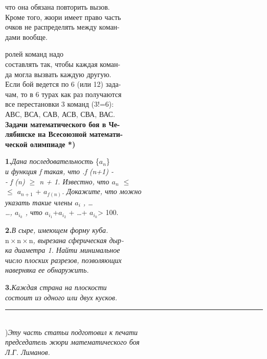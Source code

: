 \newpage
\begin{minipage}[b]{0.47\textwidth}
   \normalsize{
   что она обязана повторить вызов.\\
   Кроме того, жюри имеет право часть\\
   очков не распределять между коман-\\
   дами вообще.

    ролей команд надо\\
    составлять так, чтобы каждая коман-\\
    да могла вызвать каждую другую.\\
    Если бой ведется по 6 (или 12) зада-\\
    чам, то в 6 турах как раз получаются\\
    все перестановки 3 команд (3!=6):\\
    АВС, ВСА, САВ, АСВ, СВА, ВАС.\\

    \textbf{Задачи математического боя в Че-\\
    лябинске на Всесоюзной математи-\\
    ческой олимпиаде *)\\}

    \qquad \textbf{1.}\textit{Дана последовательность} \{$a_n$\}\\
     \textit{и функция f такая, что .f (n+1) -\\
     - f (n) $\ge$ n + 1. Известно, что $a_n$ $\le$\\
     $\le$ $a_{n+1}$} + \textit{$a_{f(n)}$. Докажите, что можно\\
     указать такие члены \indent  $a_i$ , \ldots\\
     \dots , $a_{i_k}$ , что $a_{i_1}$}+\textit{$a_{i_2}$} +   \ldots + \textit{$a_{i_k}$}> 100.

    \qquad \textbf{2.}\textit{В сыре, имеющем форму куба.\\
    $\text{n}\times \text{n}\times \text{n}$, вырезана сферическая дыр-\\
    ка диаметра 1. Найти минимальное\\
    число плоских разрезов, позволяющих\\
    наверняка ее обнаружить.}

    \qquad \textbf{3.}\textit{Каждая страна на плоскости\\
    состоит из одного или двух кусков.}\\}
    \noindent\rule{2cm}{0.4pt}\\
    \scriptsize*)\textit{Эту часть статьи подготовил к печати\\
     председатель жюри математического боя\\
     Л.Г. Лиманов.}\\
 \end{minipage}
